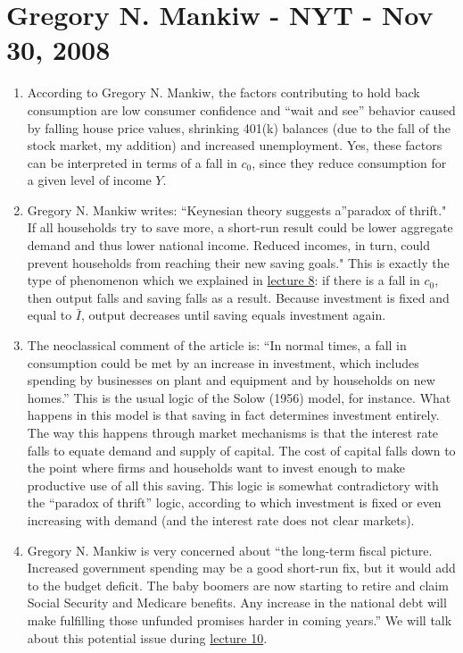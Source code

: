 \documentclass[]{book}
\theoremstyle{definition}
\theoremstyle{definition}
\theoremstyle{definition}
\theoremstyle{remark}
\begin{document}
\section*{Gregory N. Mankiw - NYT - Nov 30,
2008}\label{gregory-n.-mankiw---nyt---nov-30-2008-1}

\begin{enumerate}
\def\labelenumi{\arabic{enumi}.}
\item
  According to Gregory N. Mankiw, the factors contributing to hold back
  consumption are low consumer confidence and ``wait and see'' behavior
  caused by falling house price values, shrinking 401(k) balances (due
  to the fall of the stock market, my addition) and increased
  unemployment. Yes, these factors can be interpreted in terms of a fall
  in \(c_0\), since they reduce consumption for a given level of income
  \(Y\).
\item
  Gregory N. Mankiw writes: ``Keynesian theory suggests a''paradox of
  thrift." If all households try to save more, a short-run result could
  be lower aggregate demand and thus lower national income. Reduced
  incomes, in turn, could prevent households from reaching their new
  saving goals." This is exactly the type of phenomenon which we
  explained in \protect\hyperlink{paradox-thrift}{lecture 8}: if there
  is a fall in \(c_0\), then output falls and saving falls as a result.
  Because investment is fixed and equal to \(\bar{I}\), output decreases
  until saving equals investment again.
\item
  The neoclassical comment of the article is: ``In normal times, a fall
  in consumption could be met by an increase in investment, which
  includes spending by businesses on plant and equipment and by
  households on new homes.'' This is the usual logic of the Solow (1956)
  model, for instance. What happens in this model is that saving in fact
  determines investment entirely. The way this happens through market
  mechanisms is that the interest rate falls to equate demand and supply
  of capital. The cost of capital falls down to the point where firms
  and households want to invest enough to make productive use of all
  this saving. This logic is somewhat contradictory with the ``paradox
  of thrift'' logic, according to which investment is fixed or even
  increasing with demand (and the interest rate does not clear markets).
\item
  Gregory N. Mankiw is very concerned about ``the long-term fiscal
  picture. Increased government spending may be a good short-run fix,
  but it would add to the budget deficit. The baby boomers are now
  starting to retire and claim Social Security and Medicare benefits.
  Any increase in the national debt will make fulfilling those unfunded
  promises harder in coming years.'' We will talk about this potential
  issue during \protect\hyperlink{public-debt}{lecture 10}.
\end{enumerate}
\end{document}
